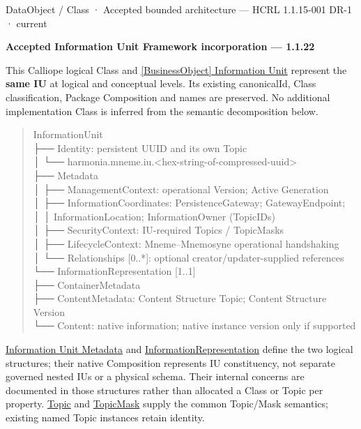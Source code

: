 \label{element:74ec609de1ae498fbf9d13e4ef8c6cbe}
{\small DataObject / Class · Accepted bounded architecture — HCRL 1.1.15-001 DR-1 · current}\par

\par\medskip\textbf{Accepted Information Unit Framework incorporation — 1.1.22}\par


This Calliope logical Class and \hyperref[element:10284034c8534b639284386b064f2c54]{[BusinessObject] Information Unit} represent the \textbf{same IU} at
logical and conceptual levels. Its existing canonicalId, Class classification,
Package Composition and names are preserved. No additional implementation Class
is inferred from the semantic decomposition below.



\begin{quote}\small\ttfamily
InformationUnit\\
├── Identity: persistent UUID and its own Topic\\
│   └── harmonia.mneme.iu.<hex-string-of-compressed-uuid>\\
├── Metadata\\
│   ├── ManagementContext: operational Version; Active Generation\\
│   ├── InformationCoordinates: PersistenceGateway; GatewayEndpoint;\\
│   │                         InformationLocation; InformationOwner (TopicIDs)\\
│   ├── SecurityContext: IU-required Topics / TopicMasks\\
│   ├── LifecycleContext: Mneme–Mnemosyne operational handshaking\\
│   └── Relationships [0..*]: optional creator/updater-supplied references\\
└── InformationRepresentation [1..1]\\
    ├── ContainerMetadata\\
    ├── ContentMetadata: Content Structure Topic; Content Structure Version\\
    └── Content: native information; native instance version only if supported\\

\end{quote}


\hyperref[element:c05b7e37278141488ecc90b9a9ef96eb]{Information Unit Metadata} and \hyperref[element:b9891b88150840ada3daefdec6f26c35]{InformationRepresentation}
define the two logical structures; their native Composition represents IU
constituency, not separate governed nested IUs or a physical schema. Their internal
concerns are documented in those structures rather than allocated a Class or Topic
per property. \hyperref[element:9e2ffa9b4a1d4422a33c2a4bbcfc86ef]{Topic} and \hyperref[element:bb489157a6bf48be926c5a601bb0a6c3]{TopicMask} supply
the common Topic/Mask semantics; existing named Topic instances retain identity.



